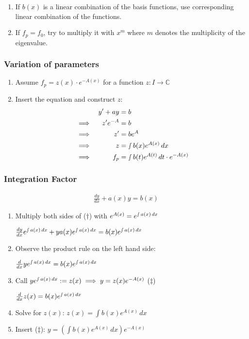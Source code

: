 \documentclass[a4paper, 10pt]{article}
\theoremstyle{definition}
\newcommand{\C}{\mathbb{C}}
\begin{document}
\begin{enumerate}
    \item If \(b(x)\) is a linear combination of the basis functions, use corresponding linear combination of the functions.
    \item If \(f_p = f_0\), try to multiply it with \(x^m\) where \(m\) denotes the multiplicity of the eigenvalue.
\end{enumerate}

\subsubsection*{Variation of parameters}
\begin{enumerate}
    \item Assume \(f_p = z(x) \cdot e^{-A(x)}\) for a function \(z: I \to \C\)
    \item Insert the equation and construct \(z\):
    \begin{align*}
        &&y' + ay &= b \\
        &\implies& z'e^{-A} &= b \\
        &\implies& z' &= be^{A} \\
        &\implies& z &= \smallint b(x)e^{A(x)}\,dx \\
        &\implies& f_p &= \smallint b(t) e^{A(t)}\,dt \cdot e^{-A(x)}
    \end{align*}
\end{enumerate}

\subsubsection*{Integration Factor}
\begin{align}
    \tag{\(\dagger\)} \frac{dy}{dx} + a(x) y = b(x)
\end{align}
\begin{enumerate}
    \item Multiply both sides of (\(\dagger\)) with \(e^{A(x)} = e^{\smallint a(x)\,dx}\) \par
    \centering
    \(\frac{dy}{dx} e^{\smallint a(x)\,dx} + ya(x)e^{\smallint a(x)\,dx} = b(x)e^{\smallint a(x)\,dx}\)
    \item \raggedright Observe the product rule on the left hand side: \par
    \centering
    \(\frac{d}{dx}ye^{\smallint a(x)\,dx} = b(x)e^{\smallint a(x)\,dx}\)
    \item \raggedright Call \(y e^{\smallint a(x)\,dx}:=z(x) \implies y = z(x)e^{-A(x)}\) (\(\ddagger\)) \par
    \centering
    \(\frac{d}{dx}z(x) = b(x)e^{\smallint a(x)\,dx}\)
    \item \raggedright Solve for \(z(x)\): \(z(x) = \int b(x) e^{A(x)}\,dx\)
    \item \raggedright Insert (\(\ddagger\)):
    \(y = \left(\int b(x)e^{A(x)} \,dx\right) e^{-A(x)}\)
\end{enumerate}
\end{document}
